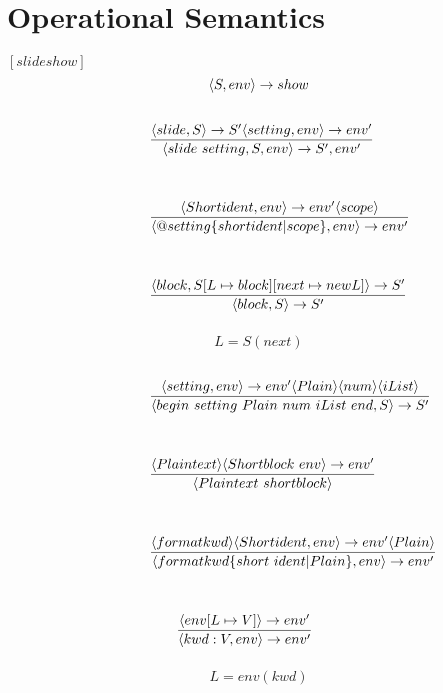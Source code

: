 \chapter{Operational Semantics}

$[slideshow]$
\[ \langle S, env \rangle \rightarrow show \]

\noindent{$[specification]$}
\[ \condinfrule{\langle slide, S \rangle \ra S' \langle setting, env \rangle \ra env'} { \langle slide~setting, S, env \rangle \ra S', env'}{} \]

\noindent{$[setting]$}
\[ \condinfrule{\langle Shortident, env \rangle \ra env' \langle scope \rangle} { \langle @ setting \{ shortident | scope \}, env \rangle \ra env'}{} \]

\noindent{$[slide]$}
\[ \condinfrule{\langle block, S[L \mapsto block] [next \mapsto new L] \rangle \ra S'} { \langle block, S \rangle \ra S'}{} \]
\[ L = S(next)\]

\noindent{$[Block]$}
\[ \condinfrule{\langle setting, env \rangle \ra env' \langle Plain \rangle \langle num \rangle \langle iList \rangle} { \langle begin~setting~Plain~num~iList~end, S \rangle \ra S'}{} \]

\noindent{$[Plain]$}
\[ \condinfrule{\langle Plaintext \rangle \langle Shortblock~env \rangle \ra env'} { \langle Plaintext~shortblock \rangle }{} \]

\noindent{$[Shortblock]$}
\[ \condinfrule{\langle formatkwd \rangle \langle Shortident, env \rangle \ra env' \langle Plain \rangle} { \langle formatkwd \{short~ident | Plain\}, env \rangle \ra env'}{} \]

\noindent{$[Shortident]$}
\[ \condinfrule{\langle env [L \mapsto V] \rangle \ra env'} { \langle kwd : V, env \rangle \ra env'}{} \]
\[ L = env(kwd)\]